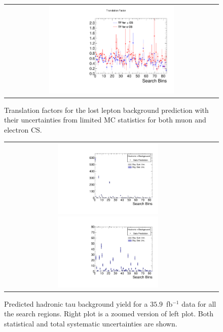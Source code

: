 \begin{figure}[htbp]
  \begin{center}
  \begin{tabular}{c}
  \includegraphics[angle=0,width=0.60\textwidth]{sections/mc4/Backgrounds/TF/figures/comp_TF_lostle_comb.pdf}
  \end{tabular}
  \caption{Translation factors for the lost lepton background prediction with their uncertainties from limited MC statistics for both muon and electron CS.}
    \label{fig:lostle_TF}
  \end{center}
\end{figure}

\begin{figure}[htbp]
  \begin{center}
  \begin{tabular}{cc}
  \includegraphics[angle=0,width=0.5\textwidth]{sections/mc4/Backgrounds/TF/figures/pred_full_hadtau_comb.pdf}
  \includegraphics[angle=0,width=0.5\textwidth]{sections/mc4/Backgrounds/TF/figures/pred_zoomin_hadtau_comb.pdf}
  \end{tabular}
  \caption{Predicted hadronic tau background yield for a $35.9$~fb$^{-1}$ data for all the search regions. Right plot is a zoomed version of left plot.
Both statistical and total systematic uncertainties are shown. }
    \label{fig:TAUpredictionSB}
  \end{center}
\end{figure}


